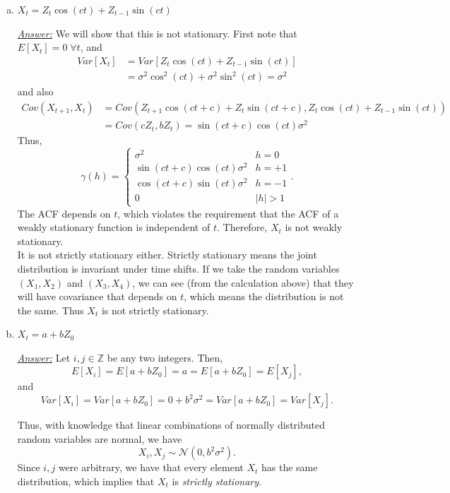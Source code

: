 \documentclass[a4paper, 11pt]{article}
\begin{document}
\begin{itemize}
\begin{enumerate}[(a)]
		\item $X_t = Z_t\cos(ct) + Z_{t-1}\sin(ct)$ \newline 

			\underline{\emph{Answer:}} We will show that this is not stationary. First note that $E[X_t] = 0 \; \forall t$, and 
\begin{align*}			
Var[X_t] & = Var[Z_t\cos(ct) + Z_{t-1}\sin(ct)] \\
& = \sigma^2\cos^2(ct) + \sigma^2\sin^2(ct) = \sigma^2
\end{align*}
 and also
\begin{align*}
Cov(X_{t+1},X_t) & = Cov(Z_{t+1}\cos(ct+c) + Z_{t}\sin(ct+c),Z_t\cos(ct) + Z_{t-1}\sin(ct) ) \\
& = Cov(cZ_t,bZ_t) = \sin(ct+c)\cos(ct)\sigma^2
\end{align*}
Thus, 
$$\gamma(h) = \left\{\begin{array}{cc} \sigma^2 & h = 0 \\ \sin(ct+c)\cos(ct)\sigma^2 & h= + 1 \\ \cos(ct+c)\sin(ct)\sigma^2 & h= - 1 \\ 0 & |h|>1 \end{array}\right. .$$
The ACF depends on $t$, which violates the requirement that the ACF of a weakly stationary function is independent of $t$. Therefore, $X_t$ is not weakly stationary.\\

It is not strictly stationary either. Strictly stationary means the joint distribution is invariant under time shifts. If we take the random variables $(X_1, X_2)$ and $(X_3, X_4)$, we can see (from the calculation above) that they will have covariance that depends on $t$, which means the distribution is not the same. Thus $X_t$ is not strictly stationary.\newline 
			

		\item $X_t = a + bZ_0$ \newline 
		
			\underline{\emph{Answer:}} Let $i,j \in \mathbb{Z}$ be any two integers. Then, 
			$$E[X_i] = E[a + bZ_0] = a = E[a + bZ_0] = E[X_j],$$
			and
			$$Var[X_i] = Var[a + bZ_0] = 0 + b^2\sigma^2 = Var[a + bZ_0] = Var[X_j].$$

Thus, with knowledge that linear combinations of normally distributed random variables are normal, we have 
$$X_i,X_j \sim \mathcal{N}(0,b^2\sigma^2) .$$
Since $i,j$ were arbitrary, we have that every element $X_t$ has the same distribution, which implies that $X_t$ is \emph{strictly stationary}. \newline 


\end{enumerate}
\end{itemize}
\end{document}
